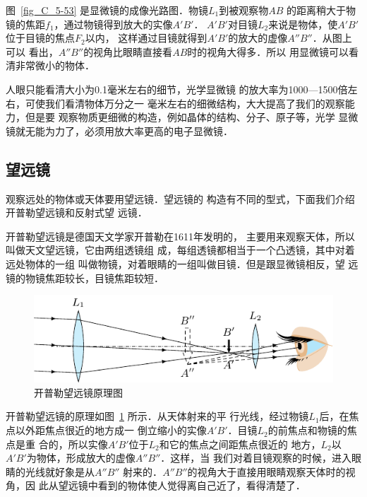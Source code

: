 图~\ref{fig_C_5-53} 是显微镜的成像光路图．物镜$L_1$到被观察物$AB$
的距离稍大于物镜的焦距$f_1$，通过物镜得到放大的实像$A'B'$．
$A'B'$对目镜$L_2$来说是物体，使$A'B'$位于目镜的焦点$F_2$以内，
这样通过目镜就得到$A'B'$的放大的虚像$A''B''$．从图上可以
看出，$A''B''$的视角比眼睛直接看$AB$时的视角大得多．所以
用显微镜可以看清非常微小的物体．

人眼只能看清大小为0.1毫米左右的细节，光学显微镜
的放大率为1000—1500倍左右，可使我们看清物体万分之一
毫米左右的细微结构，大大提高了我们的观察能力，但是要
观察物质更细微的构造，例如晶体的结构、分子、原子等，光学
显微镜就无能为力了，必须用放大率更高的电子显微镜．

\subsection{望远镜}

观察远处的物体或天体要用望远镜．望远镜的
构造有不同的型式，下面我们介绍开普勒望远镜和反射式望
远镜．

开普勒望远镜是德国天文学家开普勒在1611年发明的，
主要用来观察天体，所以叫做天文望远镜，它由两组透镜组
成，每组透镜都相当于一个凸透镜，其中对着远处物体的一组
叫做物镜，对着眼睛的一组叫做目镜．但是跟显微镜相反，望
远镜的物镜焦距较长，目镜焦距较短．
\begin{figure}[htbp]
    \centering
    \includegraphics{fig/C/5-54.pdf}
    \caption{开普勒望远镜原理图}\label{fig_C_5-54}
\end{figure}

开普勒望远镜的原理如图~\ref{fig_C_5-54} 所示．从天体射来的平
行光线，经过物镜$L_1$后，在焦点以外距焦点很近的地方成一
倒立缩小的实像$A'B'$．目镜$L_2$的前焦点和物镜的焦点是重
合的，所以实像$A'B'$位于$L_2$和它的焦点之间距焦点很近的
地方，$L_2$以$A'B'$为物体，形成放大的虚像$A''B''$．这样，当
我们对着目镜观察的时候，进入眼睛的光线就好象是从$A''B''$
射来的．$A''B''$的视角大于直接用眼睛观察天体时的视角，因
此从望远镜中看到的物体使人觉得离自己近了，看得清楚了．

